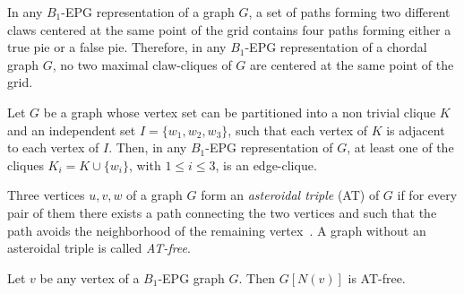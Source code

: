 \begin{lema}\label{lem:twoClawNotSameCenterInChordal}
In any $B_1$-EPG representation of a graph $G$, a set of paths forming two different claws centered at the same point of the grid contains four paths forming either a true pie or a false pie. Therefore, in any $B_1$-EPG representation of a chordal graph $G$, no two maximal claw-cliques of $G$ are centered at the same point of the grid.
\end{lema}

\begin{lema}\label{lem:3cliquesNotClaw}
Let $G$ be a graph whose vertex set  can be
partitioned into a non trivial clique $K$ and an independent set $I=\{w_1,w_2,w_3\}$, such that each vertex of $K$ is adjacent to each vertex of $I$. Then, in any $B_1$-EPG representation of $G$, at least one of the cliques  $K_i = K \cup \{w_i\}$, with $1 \leq i \leq 3$,  is an edge-clique. 
\end{lema}


Three vertices $u, v, w$ of a graph $G$ form an \textit{asteroidal triple} (AT) of $G$ if for every pair of them there exists a path connecting the two vertices and such that the path avoids the neighborhood of the remaining vertex~\cite{Asinowski2009}. A graph without an asteroidal triple is called \textit{AT-free}. 

\begin{lema}
 \label{l:AT-free} Let $v$ be any vertex of a $B_1$-EPG graph $G$. Then $G[N(v)]$ is AT-free.
\end{lema}

